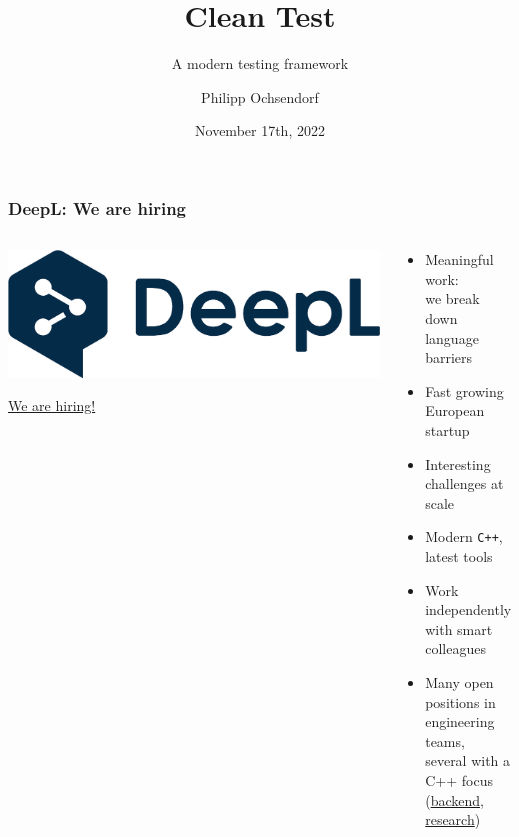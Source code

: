 \documentclass[10pt,aspectratio=169,utf8]{beamer}
\title{Clean Test}
\subtitle{A modern testing framework}
\author{Philipp Ochsendorf}
\date{November 17th, 2022}
\begin{document}
\begin{frame}
 \maketitle
\end{frame}

\begin{frame}
  \frametitle{DeepL: We are hiring}

  \begin{columns}[onlytextwidth]
    \begin{column}{.4\textwidth}
      \begin{center}
        \href{%
          https://www.deepl.com/translator
        }{%
          \includegraphics[width=\textwidth]{img/deepl}
        }

        \vspace{15pt}

        \href{%
          https://jobs.deepl.com/
        }{
          \Large{We are hiring!}
        }
      \end{center}
    \end{column}

    \begin{column}{.55\textwidth}
      \begin{itemize}
        \item
        Meaningful work: \\
        we break down language barriers

        \item
        Fast growing European startup

        \item
        Interesting challenges at scale

        \item
        Modern \texttt{C++}, latest tools

        \item
        Work independently with smart colleagues

        \vspace{10pt}

        \item Many open positions in engineering teams, \\
        several with a C++ focus
        (\href{https://jobs.deepl.com/o/senior-backendentwickler-c-wmd-deremote-koln-oder-paderborn}{backend},
        \href{https://jobs.deepl.com/o/senior-data-engineer-wmd-language-data-3}{research})
      \end{itemize}
    \end{column}
  \end{columns}
\end{frame}
\end{document}
